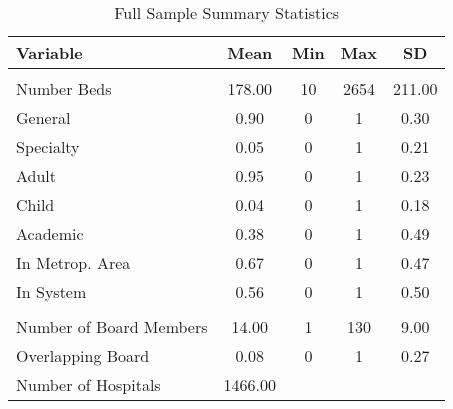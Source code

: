\begin{table}[ht!]

\caption{Full Sample Summary Statistics\label{all_sumstats}}
\centering
\begin{tabular}[t]{lcccc}
\toprule
Variable & Mean & Min & Max & SD\\
\midrule
\addlinespace[0.3em]
\multicolumn{5}{l}{\textbf{Characteristics}}\\
\hspace{1em}Number Beds & 178.00 & 10 & 2654 & 211.00\\
\hspace{1em}General & 0.90 & 0 & 1 & 0.30\\
\hspace{1em}Specialty & 0.05 & 0 & 1 & 0.21\\
\hspace{1em}Adult & 0.95 & 0 & 1 & 0.23\\
\hspace{1em}Child & 0.04 & 0 & 1 & 0.18\\
\hspace{1em}Academic & 0.38 & 0 & 1 & 0.49\\
\hspace{1em}In Metrop. Area & 0.67 & 0 & 1 & 0.47\\
\hspace{1em}In System & 0.56 & 0 & 1 & 0.50\\
\addlinespace[0.3em]
\multicolumn{5}{l}{\textbf{Board Characteristics}}\\
\hspace{1em}Number of Board Members & 14.00 & 1 & 130 & 9.00\\
\hspace{1em}Overlapping Board & 0.08 & 0 & 1 & 0.27\\
Number of Hospitals & 1466.00 &  &  & \\
\bottomrule
\end{tabular}
\end{table}
